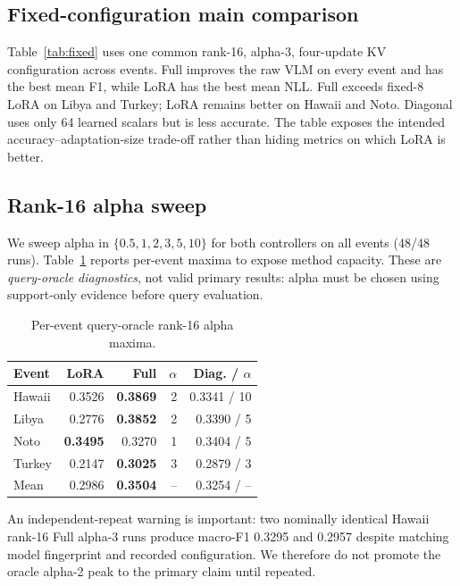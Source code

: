 \documentclass[conference]{IEEEtran}
\begin{document}
\subsection{Fixed-configuration main comparison}
Table~\ref{tab:fixed} uses one common rank-16, alpha-3, four-update KV
configuration across events. Full improves the raw VLM on every event and has
the best mean F1, while LoRA has the best mean NLL. Full exceeds fixed-8 LoRA
on Libya and Turkey; LoRA remains better on Hawaii and Noto. Diagonal uses only
64 learned scalars but is less accurate. The table exposes the intended
accuracy--adaptation-size trade-off rather than hiding metrics on which LoRA is
better.



\subsection{Rank-16 alpha sweep}
We sweep alpha in $\{0.5,1,2,3,5,10\}$ for both controllers on all events
(48/48 runs). Table~\ref{tab:oracle} reports per-event maxima to expose method
capacity. These are \emph{query-oracle diagnostics}, not valid primary results:
alpha must be chosen using support-only evidence before query evaluation.

\begin{table}[t]
\centering\small
\caption{Per-event query-oracle rank-16 alpha maxima.}
\label{tab:oracle}
\begin{tabular}{lrrrr}
\toprule
Event & LoRA & Full & $\alpha$ & Diag. / $\alpha$\\
\midrule
Hawaii & 0.3526 & \textbf{0.3869} & 2 & 0.3341 / 10\\
Libya & 0.2776 & \textbf{0.3852} & 2 & 0.3390 / 5\\
Noto & \textbf{0.3495} & 0.3270 & 1 & 0.3404 / 5\\
Turkey & 0.2147 & \textbf{0.3025} & 3 & 0.2879 / 3\\
\midrule
Mean & 0.2986 & \textbf{0.3504} & -- & 0.3254 / --\\
\bottomrule
\end{tabular}
\end{table}

An independent-repeat warning is important: two nominally identical Hawaii
rank-16 Full alpha-3 runs produce macro-F1 0.3295 and 0.2957 despite matching
model fingerprint and recorded configuration. We therefore do not promote the
oracle alpha-2 peak to the primary claim until repeated.
\end{document}
